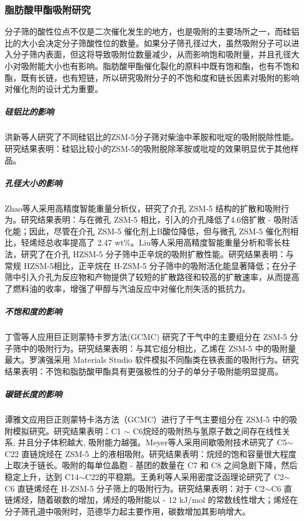 \subsubsection{脂肪酸甲酯吸附研究}
\par{分子筛的酸性位点不仅是二次催化发生的地方，也是吸附的主要场所之一，而硅铝比的大小会决定分子筛酸性位的数量。如果分子筛孔径过大，虽然吸附分子可以进入分子筛内表面，但这将导致吸附位数量减少，从而影响饱和吸附量，并且孔径大小对吸附能大小也有影响。脂肪酸甲酯催化裂化的原料中既有饱和酯，也有不饱和酯，既有长链，也有短链，所以研究吸附分子的不饱和度和链长因素对吸附的影响对催化剂的设计尤为重要。}
\subparagraph{硅铝比的影响}
\par{洪新\cite{不同硅铝比ZSM-5的合成及其吸附脱除柴油中苯胺和吡啶的性能}等人研究了不同硅铝比的ZSM-5分子筛对柴油中苯胺和吡啶的吸附脱除性能。研究结果表明：硅铝比较小的ZSM-5的吸附脱除苯胺或吡啶的效果明显优于其他样品。}
\subparagraph{孔径大小的影响}
\par{Zhao\cite{zhao2008investigation}等人采用高精度智能重量分析仪，研究了介孔 ZSM-5 结构的扩散和吸附行为。研究结果表明：与在微孔 ZSM-5 相比，引入的介孔降低了4.6倍扩散 - 吸附活化能；因此，尽管在介孔 ZSM-5 催化剂上B酸位降低，但与微孔 ZSM-5 催化剂相比，轻烯烃总收率提高了 2.47 wt\%。Liu\cite{liu2012adsorption}等人采用高精度智能重量分析和零长柱法，研究了在介孔 HZSM-5 分子筛中正辛烷的吸附扩散性能。研究结果表明：与常规 HZSM-5相比，正辛烷在 H-ZSM-5 分子筛中的吸附活化能显著降低；在分子筛中引入介孔为反应物和产物提供了较短的扩散路径和较高的扩散速率，从而提高了燃料油的收率，增强了甲醇与汽油反应中对催化剂失活的抵抗力。}
\subparagraph{不饱和度的影响}
\par{丁雪\cite{Fcc干气在zsm-5分子筛中吸附的分子模拟及热力学分析}等人应用巨正则蒙特卡罗方法(GCMC) 研究了干气中的主要组分在 ZSM-5 分子筛中的吸附行为。研究结果表明：与其它组分相比，乙烯在 ZSM-5 中的吸附量最大。罗演强\cite{生物柴油组分的润滑性能及其在铁表面吸附行为模拟探究}采用 Materials Studio 软件模拟不同酯类在铁表面的吸附行为。研究结果表明：不饱和脂肪酸甲酯具有更强极性的分子的单分子吸附能明显提高。}
\subparagraph{碳链长度的影响}
\par{谭雅文\cite{催化裂化干气组分在ZSM-5中的吸附模拟研究}应用巨正则蒙特卡洛方法（GCMC）进行了干气主要组分在 ZSM-5 中的吸附模拟研究。研究结果表明：C1 $\sim$ C6烷烃的吸附热与氢原子数之间存在线性关系, 并且分子体积越大, 吸附能力越强。Meyer\cite{de2003packing}等人采用间歇吸附技术研究了 C5$\sim$C22 直链烷烃在 ZSM-5 上的液相吸附。研究结果表明：烷烃的饱和容量很大程度上取决于链长。吸附的每单位晶胞 - 基团的数量在 C7 和 C8 之间急剧下降，然后稳定上升，达到 C14$\sim$C22的平稳期。王勇利\cite{C2-6烯烃在h-zsm-5分子筛周期性模型上吸附的理论研究}等人采用密度泛函理论研究了 C2$\sim$C6 直链烯烃在 H-ZSM-5 分子筛上的吸附行为。研究结果表明：对于 C2$\sim$C6 直链烯烃，随着碳数的增加，烯烃的吸附能以 - 12 kJ/mol 的常数线性增大；烯烃在分子筛孔道中吸附时，范德华力起主要作用，碳数增加其影响增大。}

